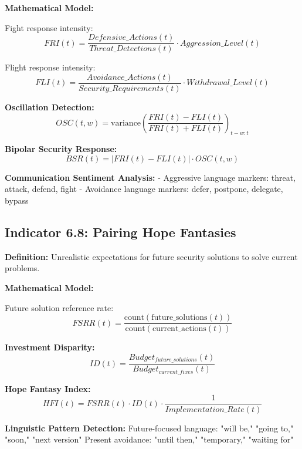 \documentclass[11pt,a4paper]{article}
\begin{document}
\textbf{Mathematical Model:}

Fight response intensity:
\begin{equation}
FRI(t) = \frac{Defensive\_Actions(t)}{Threat\_Detections(t)} \cdot Aggression\_Level(t)
\end{equation}

Flight response intensity:
\begin{equation}
FLI(t) = \frac{Avoidance\_Actions(t)}{Security\_Requirements(t)} \cdot Withdrawal\_Level(t)
\end{equation}

\textbf{Oscillation Detection:}
\begin{equation}
OSC(t,w) = \text{variance}\left(\frac{FRI(t) - FLI(t)}{FRI(t) + FLI(t)}\right)_{t-w:t}
\end{equation}

\textbf{Bipolar Security Response:}
\begin{equation}
BSR(t) = |FRI(t) - FLI(t)| \cdot OSC(t,w)
\end{equation}

\textbf{Communication Sentiment Analysis:}
- Aggressive language markers: threat, attack, defend, fight
- Avoidance language markers: defer, postpone, delegate, bypass

\subsection{Indicator 6.8: Pairing Hope Fantasies}

\textbf{Definition:} Unrealistic expectations for future security solutions to solve current problems.

\textbf{Mathematical Model:}

Future solution reference rate:
\begin{equation}
FSRR(t) = \frac{\text{count}(\text{future\_solutions}(t))}{\text{count}(\text{current\_actions}(t))}
\end{equation}

\textbf{Investment Disparity:}
\begin{equation}
ID(t) = \frac{Budget_{future\_solutions}(t)}{Budget_{current\_fixes}(t)}
\end{equation}

\textbf{Hope Fantasy Index:}
\begin{equation}
HFI(t) = FSRR(t) \cdot ID(t) \cdot \frac{1}{Implementation\_Rate(t)}
\end{equation}

\textbf{Linguistic Pattern Detection:}
Future-focused language: "will be," "going to," "soon," "next version"
Present avoidance: "until then," "temporary," "waiting for"
\end{document}
